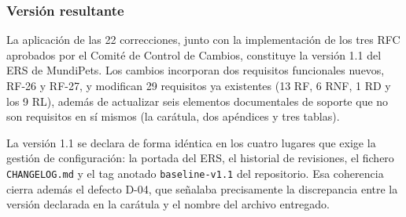 \documentclass[journal,onecolumn]{IEEEtran}
\begin{document}
	\subsubsection{Versión resultante}
	
	La aplicación de las 22 correcciones, junto con la implementación de los
	tres RFC aprobados por el Comité de Control de Cambios, constituye la
	versión 1.1 del ERS de MundiPets. Los cambios incorporan dos requisitos
	funcionales nuevos, RF-26 y RF-27, y modifican 29 requisitos ya existentes
	(13 RF, 6 RNF, 1 RD y los 9 RL), además de actualizar seis elementos
	documentales de soporte que no son requisitos en sí mismos (la carátula,
	dos apéndices y tres tablas).
	
	La versión 1.1 se declara de forma idéntica en los cuatro lugares que exige
	la gestión de configuración: la portada del ERS, el historial de
	revisiones, el fichero \texttt{CHANGELOG.md} y el tag anotado
	\texttt{baseline-v1.1} del repositorio. Esa coherencia cierra además el
	defecto D-04, que señalaba precisamente la discrepancia entre la versión
	declarada en la carátula y el nombre del archivo entregado.
	
\end{document}
